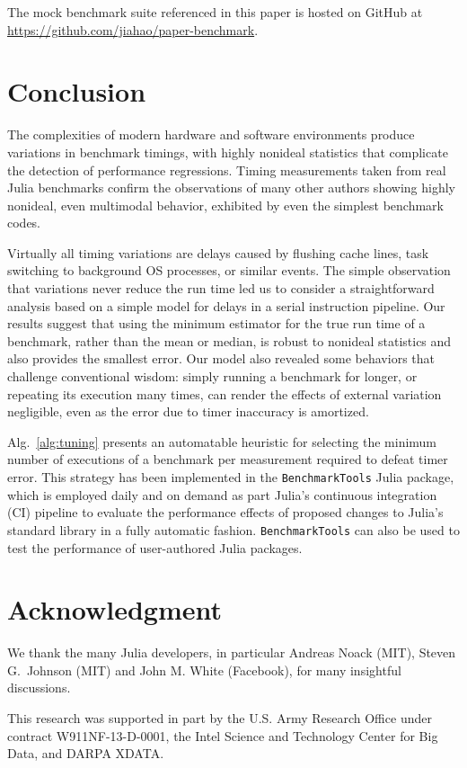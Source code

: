 \documentclass[conference]{IEEEtran}
\begin{document}
The mock benchmark suite referenced in this paper is hosted on GitHub at
\url{https://github.com/jiahao/paper-benchmark}.

\section{Conclusion}
\label{sec:conclusion}

The complexities of modern hardware and software environments produce
variations in benchmark timings, with highly nonideal statistics that
complicate the detection of performance regressions. Timing measurements taken
from real Julia benchmarks confirm the observations of many other authors
showing highly nonideal, even multimodal behavior, exhibited by even the
simplest benchmark codes.

Virtually all timing variations are delays caused by flushing cache lines, task
switching to background OS processes, or similar events. The simple
observation that variations never reduce the run time led us to consider a
straightforward analysis based on a simple model for delays in a serial
instruction pipeline. Our results suggest that using the minimum estimator for
the true run time of a benchmark, rather than the mean or median, is robust to
nonideal statistics and also provides the smallest error.  Our model also
revealed some behaviors that challenge conventional wisdom: simply
running a benchmark for longer, or repeating its execution many times, can
render the effects of external variation negligible, even as the error due to
timer inaccuracy is amortized.

Alg.~\ref{alg:tuning} presents an automatable heuristic for selecting the
minimum number of executions of a benchmark per measurement required to defeat
timer error. This strategy has been implemented in the
\lstinline|BenchmarkTools| Julia package, which is employed daily and on demand
as part Julia's continuous integration (CI) pipeline to evaluate the
performance effects of proposed changes to Julia's standard library in a fully
automatic fashion. \lstinline|BenchmarkTools| can also be used to test the
performance of user-authored Julia packages.


\section*{Acknowledgment}
\label{sec:acknowledgement}

We thank the many Julia developers, in particular Andreas Noack (MIT), Steven
G.\ Johnson (MIT) and John M. White (Facebook), for many insightful
discussions.

This research was supported in part by the U.S. Army Research Office under
contract W911NF-13-D-0001, the Intel Science and Technology Center for Big
Data, and DARPA XDATA.




\end{document}
